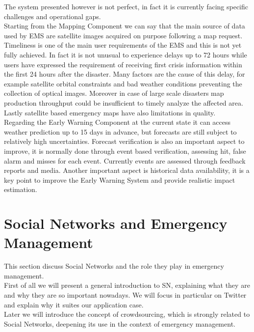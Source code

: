 \noindent The system presented however is not perfect, in fact it is currently facing specific challenges and operational gaps.
\\
Starting from the Mapping Component we can say that the main source of data used by EMS are satellite images acquired on purpose following a map request. Timeliness is one of the main user requirements of the EMS and this is not yet fully achieved. In fact it is not unusual to experience delays up to 72 hours while users have expressed the requirement of receiving first crisis information within the first 24 hours after the disaster. Many factors are the cause of this delay, for example satellite orbital constraints and bad weather conditions preventing the collection of optical images. Moreover in case of large scale disasters map production throughput could be insufficient to timely analyze the affected area. Lastly satellite based emergency maps have also limitations in quality.
\\
Regarding the Early Warning Component at the current state it can access weather prediction up to 15 days in advance, but forecasts are still subject to relatively high uncertainties. Forecast verification is also an important aspect to improve, it is normally done through event based verification, assessing hit, false alarm and misses for each event. Currently events are assessed through feedback reports and media. Another important aspect is historical data availability, it is a key point to improve the Early Warning System and provide realistic impact estimation.

\newpage
\section{Social Networks and Emergency Management}
\noindent This section discuss Social Networks and the role they play in emergency management.
\\
\noindent First of all we will present a general introduction to SN, explaining what they are and why they are so important nowadays. We will focus in particular on Twitter and explain why it suites our application case.
\\
Later we will introduce the concept of crowdsourcing, which is strongly related to Social Networks, deepening its use in the context of emergency management.

